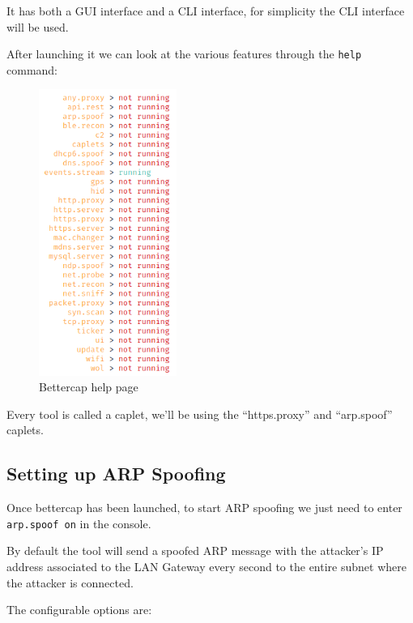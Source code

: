 It has both a GUI interface and a CLI interface, for simplicity the CLI interface will be used.

After launching it we can look at the various features through the \verb|help| command:

\begin{figure}[h!]
 \centering
 \includegraphics[width=4.5cm]{img/bettercap_help.png}
 \caption{Bettercap help page}
 \label{fig: bettercap help}
\end{figure}

Every tool is called a caplet, we'll be using the ``https.proxy'' and ``arp.spoof'' caplets.

\newpage

\subsection{Setting up ARP Spoofing}

Once bettercap has been launched, to start ARP spoofing we just need to enter \verb|arp.spoof on| in the console.

By default the tool will send a spoofed ARP message with the attacker's IP address associated to the LAN Gateway every second to the entire subnet where the attacker is connected.

The configurable options are\cite{arp-poof-source-code}:

